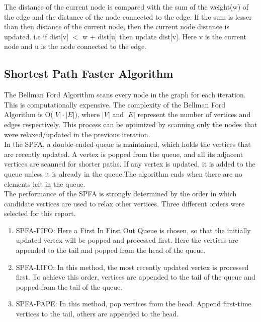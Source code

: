 \documentclass[12pt]{article}
\begin{document}
The distance of the current node is compared with the sum of the weight(w) of the edge and the distance of the node connected to the edge. If the sum is lesser than then distance of the current node, then the current node distance is updated. i.e if dist[v] $<$ w + dist[u] then update dist[v]. Here v is the current node and u is the node connected to the edge.

\subsection{Shortest Path Faster Algorithm}
The Bellman Ford Algorithm scans every node in the graph for each iteration. This is computationally expensive. The complexity of the Bellman Ford Algorithm is O($|V| \cdot |E|$), where $|V|$ and $|E|$ represent the number of vertices and edges respectively. This process can be optimized by scanning only the nodes that were relaxed/updated in the previous iteration. \\

In the SPFA, a double-ended-queue is maintained, which holds the vertices that are recently updated. A vertex is popped from the queue, and all its adjacent vertices are scanned for shorter paths. If any vertex is updated, it is added to the queue unless it is already in the queue.The algorithm ends when there are no elements left in the queue. \\

The performance of the SPFA is strongly determined by the order in which candidate vertices are used to relax other vertices. Three different orders were selected for this report. 

\begin{enumerate}
	\item SPFA-FIFO: Here a First In First Out Queue is chosen, so that the initially updated vertex will be popped and processed first. Here the vertices are appended to the tail and popped from the head of the queue.
	
	\item SPFA-LIFO: In this method, the most recently updated vertex is processed first. To achieve this order, vertices are appended to the tail of the queue and popped from the tail of the queue. 
	
	\item SPFA-PAPE: In this method, pop vertices from the head. Append first-time vertices to the tail, others are appended to the head. 
\end{enumerate}
\end{document}

